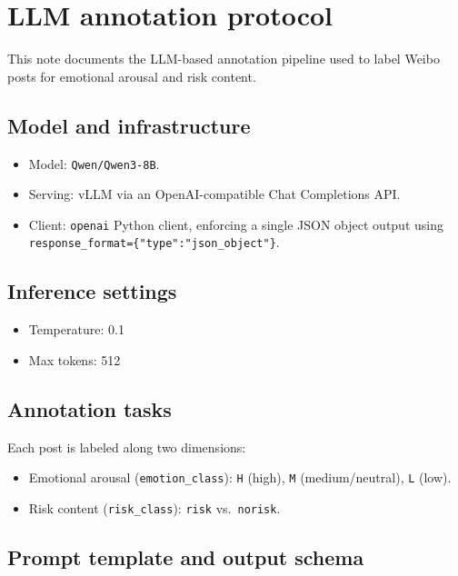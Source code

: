 \section{LLM annotation protocol}
\label{supp:s1-llm}

This note documents the LLM-based annotation pipeline used to label Weibo posts for emotional arousal and risk content.

\subsection{Model and infrastructure}

\begin{itemize}
  \item Model: \texttt{Qwen/Qwen3-8B}.
  \item Serving: vLLM via an OpenAI-compatible Chat Completions API.
  \item Client: \texttt{openai} Python client, enforcing a single JSON object output using \texttt{response\_format=\{"type":"json\_object"\}}.
\end{itemize}

\subsection{Inference settings}

\begin{itemize}
  \item Temperature: 0.1
  \item Max tokens: 512
\end{itemize}

\subsection{Annotation tasks}

Each post is labeled along two dimensions:
\begin{itemize}
  \item Emotional arousal (\texttt{emotion\_class}): \texttt{H} (high), \texttt{M} (medium/neutral), \texttt{L} (low).
  \item Risk content (\texttt{risk\_class}): \texttt{risk} vs.\ \texttt{norisk}.
\end{itemize}

\subsection{Prompt template and output schema}

